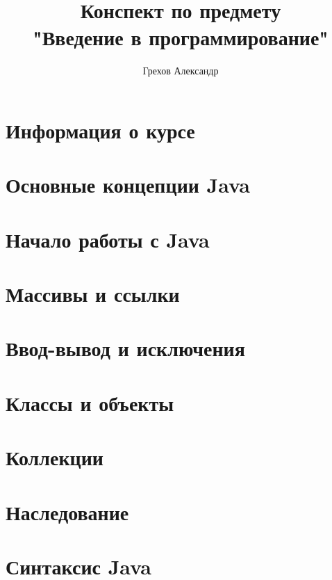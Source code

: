\documentclass{article}
\title{Конспект по предмету \\"Введение в программирование"}
\author{Грехов Александр}
\date{ }
\begin{document}
\maketitle
\tableofcontents

\newpage
\section{Информация о курсе}


\newpage
\section{Основные концепции Java}


\newpage
\section{Начало работы с Java}


\newpage
\section{Массивы и ссылки}


\newpage
\section{Ввод-вывод и исключения}


\newpage
\section{Классы и объекты}


\newpage
\section{Коллекции}


\newpage
\section{Наследование}


\newpage
\section{Синтаксис Java}

\end{document}
